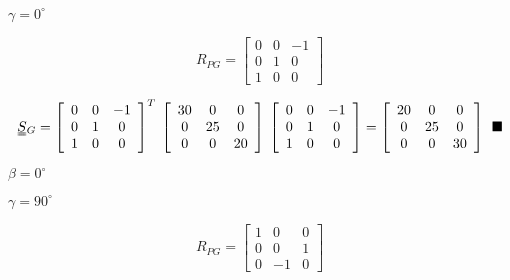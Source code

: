 \documentclass[onecolumn,11pt]{report}
\def\lthtmlcheckvsize{\ifdim\ht\sizebox<\vsize 
  \ifdim\wd\sizebox<\hsize\expandafter\hfill\fi \expandafter\vfill
  \else\expandafter\vss\fi}%
\begin{document}
{\newpage\clearpage
{}%
$ \gamma = 0^{\circ}$%
\lthtmlindisplaymathZ
\lthtmlcheckvsize\clearpage}

{\newpage\clearpage
{}%
\begin{displaymath}R_{PG}
=
\left[
\begin{array}{ccc}
0  & 0  & -1 \\
0  & 1  & 0 \\
1  & 0  & 0
\end{array}
\right]\end{displaymath}%
\lthtmldisplayZ
\lthtmlcheckvsize\clearpage}

{\newpage\clearpage
{}%
\begin{displaymath}\uuline{S}{}_G
=
\left[
\begin{array}{ccc}
0  & 0  & -1 \\
0  & 1  & 0 \\
1  & 0  & 0
\end{array}
\right]^T
\:
\left[
\begin{array}{ccc}
30 & 0  & 0 \\
0  & 25 & 0 \\
0  &  0 & 20
\end{array}
\right]
\:
\left[
\begin{array}{ccc}
0  & 0  & -1 \\
0  & 1  & 0 \\
1  & 0  & 0
\end{array}
\right]
=
\left[
\begin{array}{ccc}
20 & 0  & 0 \\
0  & 25 & 0 \\
0  &  0 & 30
\end{array}
\right]
\: \: \blacksquare\end{displaymath}%
\lthtmldisplayZ
\lthtmlcheckvsize\clearpage}

{\newpage\clearpage
{}%
$ \beta = 0^{\circ}$%
\lthtmlindisplaymathZ
\lthtmlcheckvsize\clearpage}

{\newpage\clearpage
{}%
$ \gamma = 90^{\circ}$%
\lthtmlindisplaymathZ
\lthtmlcheckvsize\clearpage}

{\newpage\clearpage
{}%
\begin{displaymath}R_{PG}
=
\left[
\begin{array}{ccc}
1  & 0  & 0 \\
0  & 0  & 1 \\
0  & -1 & 0
\end{array}
\right]\end{displaymath}%
\lthtmldisplayZ
\lthtmlcheckvsize\clearpage}
\end{document}
